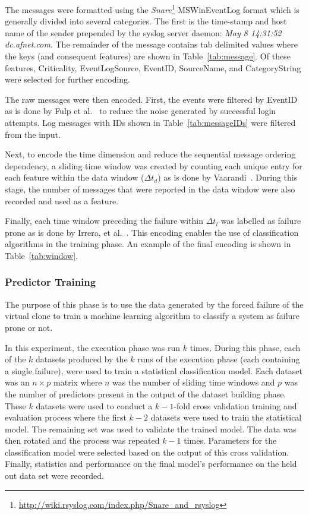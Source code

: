 The messages were formatted using the
\emph{Snare}\footnote{\url{http://wiki.rsyslog.com/index.php/Snare\_and\_rsyslog}}
MSWinEventLog format which is generally divided into several categories.  The
first is the time-stamp and host name of the sender prepended by the syslog
server daemon: \emph{May 8 14:31:52 dc.afnet.com}.  The remainder of the
message contains tab delimited values where the keys (and consequent features)
are shown in Table~\ref{tab:message}.  Of these features, Criticality,
EventLogSource, EventID, SourceName, and CategoryString were selected for
further encoding.

\tabMessage

The raw messages were then encoded.  First, the events were filtered by EventID
as is done by Fulp et al.~\cite{fulp2008} to reduce the noise generated by
successful login attempts.  Log messages with IDs shown in
Table~\ref{tab:messageIDs} were filtered from the input.  

Next, to encode the time dimension and reduce the sequential message ordering
dependency, a sliding time window was created by counting each unique entry for
each feature within the data window ($\Delta t_d$) as is done by
Vaarandi~\cite{vaarandi2002}.  During this stage, the number of messages that
were reported in the data window were also recorded and used as a feature.

Finally, each time window preceding the failure within $\Delta t_l$ was
labelled as failure prone as is done by Irrera, et al.~\cite{irrera2015}.  This
encoding enables the use of classification algorithms in the training phase.
An example of the final encoding is shown in Table~\ref{tab:window}.

\tabMessageIDs %
\tabSlidingWindow

\subsubsection{Predictor Training} \label{sec:predictor.training}
The purpose of this phase is to use the data generated by the forced failure of
the virtual clone to train a machine learning algorithm to classify a system as
failure prone or not.  

In this experiment, the execution phase was run $k$ times.  During this phase,
each of the $k$ datasets produced by the $k$ runs of the execution phase (each
containing a single failure), were used to train a statistical classification
model.  Each dataset was an $n \times p$ matrix where $n$ was the number of
sliding time windows and $p$ was the number of predictors present in the output
of the dataset building phase.  These $k$ datasets were used to conduct a $k -
1$-fold cross validation training and evaluation process where the first $k -
2$ datasets were used to train the statistical model.  The remaining set was
used to validate the trained model.  The data was then rotated and the process
was repeated $k - 1$ times.  Parameters for the classification model were
selected based on the output of this cross validation.  Finally, statistics and
performance on the final model's performance on the held out data set were
recorded.

